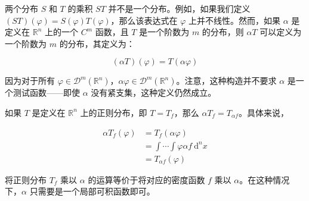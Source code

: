 两个分布 $S$ 和 $T$ 的乘积 $S T$
并不是一个分布。例如，如果我们定义
$(S T)(\varphi) = S(\varphi) T(\varphi)$，那么该表达式在 $\varphi$
上并不线性。然而，如果 $\alpha$ 是定义在 $\mathbb{R}^n$ 上的一个
$C^m$ 函数，且 $T$ 是一个阶数为 $m$ 的分布，则 $\alpha T$
可以定义为一个阶数为 $m$ 的分布，其定义为：

$$
(\alpha T)(\varphi) = T(\alpha \varphi)
$$

因为对于所有
$\varphi \in \mathcal{D}^m(\mathbb{R}^n)$，$\alpha \varphi \in \mathcal{D}^m(\mathbb{R}^n)$。注意，这种构造并不要求
$\alpha$ 是一个测试函数------即使 $\alpha$
没有紧支集，这种定义仍然成立。

如果 $T$ 是定义在 $\mathbb{R}^n$ 上的正则分布，即 $T = T_f$，那么
$\alpha T_f = T_{\alpha f}$。具体来说，

$$
\begin{aligned}
\alpha T_f(\varphi) & = T_f(\alpha \varphi) \\
& = \int \cdots \int \varphi \alpha f \mathrm{~d}^n x \\
& = T_{\alpha f}(\varphi)
\end{aligned}
$$

将正则分布 $T_f$ 乘以 $\alpha$ 的运算等价于将对应的密度函数 $f$
乘以 $\alpha$。在这种情况下，$\alpha$ 只需要是一个局部可积函数即可。

